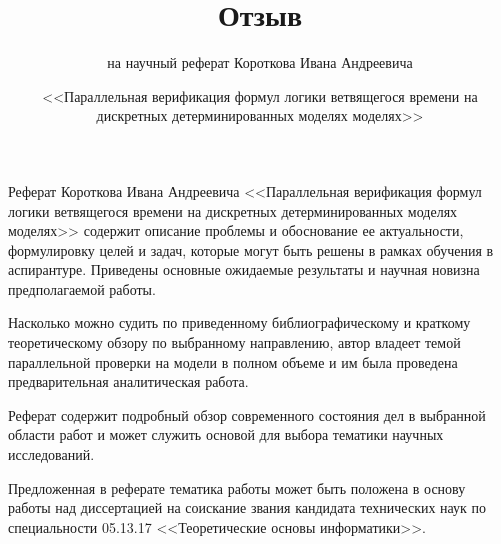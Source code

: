 \documentclass[a4paper,12pt,notitlepage]{article}
\title{Отзыв}
\date{\normalsize{<<Параллельная верификация формул логики ветвящегося времени на
    дискретных детерминированных моделях моделях>>}}
\author{\small{на научный реферат Короткова Ивана Андреевича}}
\begin{document}
\maketitle

\vspace{3cm}

\thispagestyle{empty}

Реферат Короткова Ивана Андреевича <<Параллельная верификация формул логики ветвящегося
времени на дискретных детерминированных моделях моделях>> содержит описание проблемы и
обоснование ее актуальности, формулировку целей и задач, которые могут быть решены в
рамках обучения в аспирантуре. Приведены основные ожидаемые результаты и научная новизна
предполагаемой работы.

Насколько можно судить по приведенному библиографическому и краткому теоретическому обзору
по выбранному направлению, автор владеет темой параллельной проверки на модели в полном
объеме и им была проведена предварительная аналитическая работа.

Реферат содержит подробный обзор современного состояния дел в выбранной области работ и
может служить основой для выбора тематики научных исследований.

Предложенная в реферате тематика работы может быть положена в основу работы над
диссертацией на соискание звания кандидата технических наук по специальности 05.13.17
<<Теоретические основы информатики>>.

\end{document}
